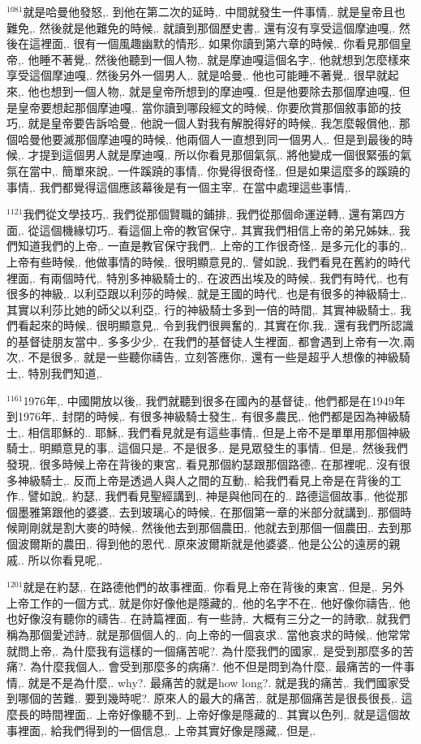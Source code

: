 \documentclass{book}
\begin{document}
$^{1081}$就是哈曼他發怒,.
到他在第二次的延時,.
中間就發生一件事情,.
就是皇帝且也難免,.
然後就是他難免的時候,.
就讀到那個歷史書,.
還有沒有享受這個摩迪嘎,.
然後在這裡面,.
很有一個風趣幽默的情形,.
如果你讀到第六章的時候,.
你看見那個皇帝,.
他睡不著覺,.
然後他聽到一個人物,.
就是摩迪嘎這個名字,.
他就想到怎麼樣來享受這個摩迪嘎,.
然後另外一個男人,.
就是哈曼,.
他也可能睡不著覺,.
很早就起來,.
他也想到一個人物,.
就是皇帝所想到的摩迪嘎,.
但是他要除去那個摩迪嘎,.
但是皇帝要想起那個摩迪嘎,.
當你讀到哪段經文的時候,.
你要欣賞那個敘事節的技巧,.
就是皇帝要告訴哈曼,.
他說一個人對我有解脫得好的時候,.
我怎麼報償他,.
那個哈曼他要滅那個摩迪嘎的時候,.
他兩個人一直想到同一個男人,.
但是到最後的時候,.
才提到這個男人就是摩迪嘎,.
所以你看見那個氣氛,.
將他變成一個很緊張的氣氛在當中,.
簡單來說,.
一件蹊蹺的事情,.
你覺得很奇怪,.
但是如果這麼多的蹊蹺的事情,.
我們都覺得這個應該幕後是有一個主宰,.
在當中處理這些事情,.

$^{1121}$我們從文學技巧,.
我們從那個賢職的鋪排,.
我們從那個命運逆轉,.
還有第四方面,.
從這個機緣切巧,.
看這個上帝的教官保守,.
其實我們相信上帝的弟兄姊妹,.
我們知道我們的上帝,.
一直是教官保守我們,.
上帝的工作很奇怪,.
是多元化的事的,.
上帝有些時候,.
他做事情的時候,.
很明顯意見的,.
譬如說,.
我們看見在舊約的時代裡面,.
有兩個時代,.
特別多神級騎士的,.
在波西出埃及的時候,.
我們有時代,.
也有很多的神級,.
以利亞跟以利莎的時候,.
就是王國的時代,.
也是有很多的神級騎士,.
其實以利莎比她的師父以利亞,.
行的神級騎士多到一倍的時間,.
其實神級騎士,.
我們看起來的時候,.
很明顯意見,.
令到我們很興奮的,.
其實在你,我,.
還有我們所認識的基督徒朋友當中,.
多多少少,.
在我們的基督徒人生裡面,.
都會遇到上帝有一次,兩次,.
不是很多,.
就是一些聽你禱告,.
立刻答應你,.
還有一些是超乎人想像的神級騎士,.
特別我們知道,.

$^{1161}$1976年,.
中國開放以後,.
我們就聽到很多在國內的基督徒,.
他們都是在1949年到1976年,.
封閉的時候,.
有很多神級騎士發生,.
有很多農民,.
他們都是因為神級騎士,.
相信耶穌的..
耶穌,.
我們看見就是有這些事情,.
但是上帝不是單單用那個神級騎士,.
明顯意見的事,.
這個只是,.
不是很多,.
是見眾發生的事情..
但是,.
然後我們發現,.
很多時候上帝在背後的東宮,.
看見那個約瑟跟那個路德,.
在那裡呢,.
沒有很多神級騎士,.
反而上帝是透過人與人之間的互動,.
給我們看見上帝是在背後的工作..
譬如說,.
約瑟,.
我們看見聖經講到,.
神是與他同在的..
路德這個故事,.
他從那個墨雅第跟他的婆婆,.
去到玻璃心的時候,.
在那個第一章的米部分就講到,.
那個時候剛剛就是割大麥的時候,.
然後他去到那個農田,.
他就去到那個一個農田,.
去到那個波爾斯的農田,.
得到他的恩代..
原來波爾斯就是他婆婆,.
他是公公的遠房的親戚..
所以你看見呢,.

$^{1201}$就是在約瑟,.
在路德他們的故事裡面,.
你看見上帝在背後的東宮..
但是,.
另外上帝工作的一個方式,.
就是你好像他是隱藏的,.
他的名字不在,.
他好像你禱告,.
他也好像沒有聽你的禱告..
在詩篇裡面,.
有一些詩,.
大概有三分之一的詩歌,.
就我們稱為那個愛述詩,.
就是那個個人的,.
向上帝的一個哀求..
當他哀求的時候,.
他常常就問上帝,.
為什麼我有這樣的一個痛苦呢?.
為什麼我們的國家,.
是受到那麼多的苦痛?.
為什麼我個人,.
會受到那麼多的病痛?.
他不但是問到為什麼,.
最痛苦的一件事情,.
就是不是為什麼,.
why?.
最痛苦的就是how long?.
就是我的痛苦,.
我們國家受到哪個的苦難,.
要到幾時呢?.
原來人的最大的痛苦,.
就是那個痛苦是很長很長,.
這麼長的時間裡面,.
上帝好像聽不到,.
上帝好像是隱藏的..
其實以色列,.
就是這個故事裡面,.
給我們得到的一個信息,.
上帝其實好像是隱藏,.
但是,.
\end{document}
